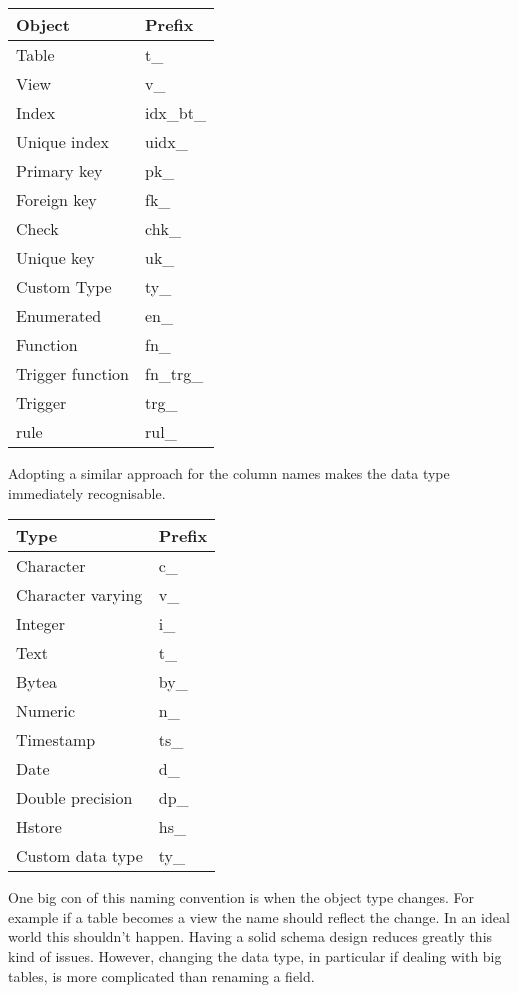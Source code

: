 \begin{table}[H]
\begin{tabular}{ll}
 \textbf{Object} & \textbf{Prefix}  \\
 \hline
 Table & t\_ \\
 View & v\_ \\
Index & idx\_bt\_ \\
Unique index & uidx\_ \\
Primary key & pk\_ \\
Foreign key & fk\_ \\
Check & chk\_ \\
Unique key & uk\_ \\
Custom Type & ty\_ \\
Enumerated & en\_ \\
Function & fn\_ \\
Trigger function & fn\_trg\_ \\
Trigger & trg\_ \\
rule & rul\_ \\

\end{tabular}
\end{table}

Adopting a similar approach for the column names makes the data type immediately recognisable.

\begin{table}[H]
\begin{tabular}{ll}
 \textbf{Type} & \textbf{Prefix}  \\
 \hline
 Character & c\_ \\
 Character varying & v\_ \\
Integer & i\_ \\
Text & t\_ \\
Bytea & by\_ \\
Numeric & n\_ \\
Timestamp & ts\_ \\
Date & d\_ \\
Double precision & dp\_ \\
Hstore & hs\_ \\
Custom data type & ty\_ \\

\end{tabular}
\end{table}

One big con of this naming convention is when the object type changes. For example if a table becomes a view the name 
should reflect the change. In an ideal world this shouldn't happen. Having a solid schema design reduces greatly this 
kind of issues. However, changing the data type, in particular if dealing with big tables, is more complicated than 
renaming a field.



